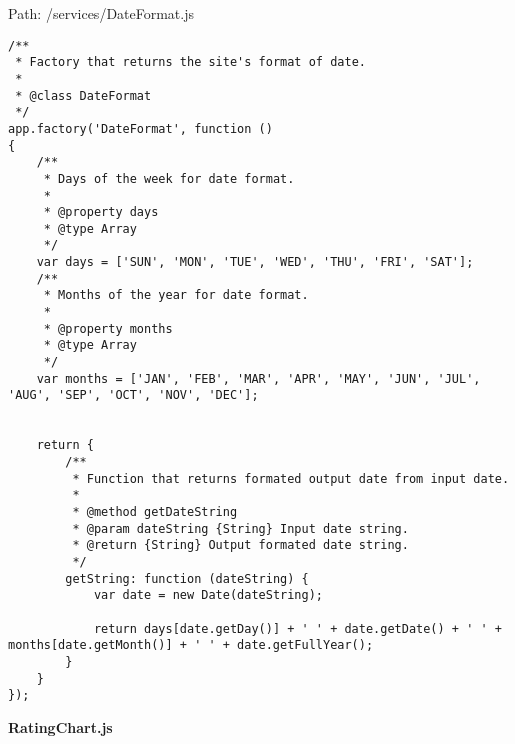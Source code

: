 Path: /services/DateFormat.js
{\scriptsize
\begin{lstlisting}
/**
 * Factory that returns the site's format of date.
 *
 * @class DateFormat
 */
app.factory('DateFormat', function ()
{
	/**
	 * Days of the week for date format.
	 *
	 * @property days
	 * @type Array
	 */
	var days = ['SUN', 'MON', 'TUE', 'WED', 'THU', 'FRI', 'SAT'];
	/**
	 * Months of the year for date format.
	 *
	 * @property months
	 * @type Array
	 */
	var months = ['JAN', 'FEB', 'MAR', 'APR', 'MAY', 'JUN', 'JUL', 'AUG', 'SEP', 'OCT', 'NOV', 'DEC'];


	return {
		/**
		 * Function that returns formated output date from input date.
		 *
		 * @method getDateString
		 * @param dateString {String} Input date string.
		 * @return {String} Output formated date string.
		 */
		getString: function (dateString) {
			var date = new Date(dateString);

			return days[date.getDay()] + ' ' + date.getDate() + ' ' + months[date.getMonth()] + ' ' + date.getFullYear();
		}
	}
});\end{lstlisting}
}
\textbf{RatingChart.js}\label{RatingChart.js}


